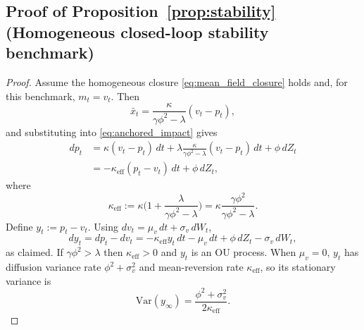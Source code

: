 \subsection*{Proof of Proposition~\ref{prop:stability} (Homogeneous closed-loop stability benchmark)}
\begin{proof}
Assume the homogeneous closure \eqref{eq:mean_field_closure} holds and, for this benchmark, $m_t=v_t$. Then
\[
\bar x_t=\frac{\kappa}{\gamma\phi^2-\lambda}(v_t-p_t),
\]
and substituting into \eqref{eq:anchored_impact} gives
\[
\begin{aligned}
dp_t
&=\kappa(v_t-p_t)\,dt+\lambda\frac{\kappa}{\gamma\phi^2-\lambda}(v_t-p_t)\,dt+\phi\,dZ_t\\
&= -\kappa_{\mathrm{eff}}(p_t-v_t)\,dt+\phi\,dZ_t,
\end{aligned}
\]
where
\[
\kappa_{\mathrm{eff}}:=\kappa\Big(1+\frac{\lambda}{\gamma\phi^2-\lambda}\Big)
=\kappa\frac{\gamma\phi^2}{\gamma\phi^2-\lambda}.
\]
Define $y_t:=p_t-v_t$. Using $dv_t=\mu_v\,dt+\sigma_v\,dW_t$,
\[
dy_t=dp_t-dv_t=-\kappa_{\mathrm{eff}}y_t\,dt-\mu_v\,dt+\phi\,dZ_t-\sigma_v\,dW_t,
\]
as claimed. If $\gamma\phi^2>\lambda$ then $\kappa_{\mathrm{eff}}>0$ and $y_t$ is an OU process.
When $\mu_v=0$, $y_t$ has diffusion variance rate $\phi^2+\sigma_v^2$ and mean-reversion rate $\kappa_{\mathrm{eff}}$,
so its stationary variance is
\[
\mathrm{Var}(y_\infty)=\frac{\phi^2+\sigma_v^2}{2\kappa_{\mathrm{eff}}}.
\]
\end{proof}

